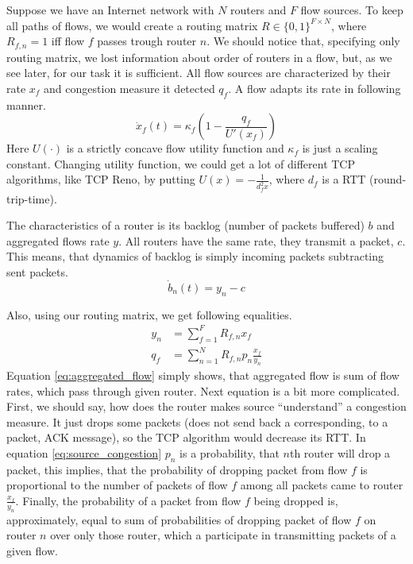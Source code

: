 Suppose we have an Internet network with $N$ routers and $F$ flow sources. To keep all paths of flows, we would create a routing matrix $R \in \{0, 1\}^{F \times N}$, where $R_{f, n} = 1$ iff flow $f$ passes trough router $n$. We should notice that, specifying only routing matrix, we lost information about order of routers in a flow, but, as we see later, for our task it is sufficient. All flow sources are characterized by their rate $x_f$ and congestion measure it detected $q_f$. A flow adapts its rate in following manner.
\begin{equation}
    \dot{x}_f(t) = \kappa_f \left( 1 - \frac{q_f}{U'(x_f)} \right) \label{eq:rate_dynamic}
\end{equation}
Here $U(\cdot)$ is a strictly concave flow utility function and $\kappa_f$ is just a scaling constant. Changing utility function, we could get a lot of different TCP algorithms, like TCP Reno, by putting $U(x) = -\frac{1}{d_f^2 x}$, where $d_f$ is a RTT (round-trip-time).

The characteristics of a router is its backlog (number of packets buffered) $b$ and aggregated flows rate $y$. All routers have the same rate, they transmit a packet, $c$. This means, that dynamics of backlog is simply incoming packets subtracting sent packets.
\begin{equation}
    \dot{b}_n(t) = y_n - c \label{eq:backlog_dynamic}
\end{equation}

Also, using our routing matrix, we get following equalities.
\begin{align}
    y_n & = \sum \limits_{f=1}^F R_{f,n} x_f \label{eq:aggregated_flow} \\
    q_f & = \sum \limits_{n=1}^N R_{f,n} p_n \frac{x_f}{y_n} \label{eq:source_congestion}
\end{align}
Equation \ref{eq:aggregated_flow} simply shows, that aggregated flow is sum of flow rates, which pass through given router. Next equation is a bit more complicated. First, we should say, how does the router makes source ``understand'' a congestion measure. It just drops some packets (does not send back a corresponding, to a packet, ACK message), so the TCP algorithm would decrease its RTT. In equation \ref{eq:source_congestion} $p_n$ is a probability, that $n$th router will drop a packet, this implies, that the probability of dropping packet from flow $f$ is proportional to the number of packets of flow $f$ among all packets came to router $\frac{x_f}{y_n}$. Finally, the probability of a packet from flow $f$ being dropped is, approximately, equal to sum of probabilities of dropping packet of flow $f$ on router $n$ over only those router, which a participate in transmitting packets of a given flow.

